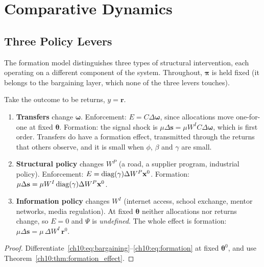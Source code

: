 \documentclass[../structural_economics_book.tex]{subfiles}
\begin{document}
\section{Comparative Dynamics}
\label{ch10:sec:comparative}

\subsection{Three Policy Levers}

The formation model distinguishes three types of structural intervention, each operating on a different component of the system. Throughout, $\boldsymbol{\pi}$ is held fixed (it belongs to the bargaining layer, which none of the three levers touches).

\begin{proposition}\label{ch10:prop:levers}
Take the outcome to be returns, $y = \mathbf{r}$.
\begin{enumerate}
\item \textbf{Transfers} change $\boldsymbol{\omega}$. Enforcement: $E = C\Delta\boldsymbol{\omega}$, since allocations move one-for-one at fixed $\boldsymbol{\theta}$. Formation: the signal shock is $\mu\Delta\mathbf{s} = \mu W^I C\Delta\boldsymbol{\omega}$, which is first order. Transfers do have a formation effect, transmitted through the returns that others observe, and it is small when $\phi$, $\beta$ and $\gamma$ are small.
\item \textbf{Structural policy} changes $W^P$ (a road, a supplier program, industrial policy). Enforcement: $E = \operatorname{diag}(\gamma)\Delta W^P\mathbf{x}^0$. Formation: $\mu\Delta\mathbf{s} = \mu W^I\operatorname{diag}(\gamma)\Delta W^P\mathbf{x}^0$.
\item \textbf{Information policy} changes $W^I$ (internet access, school exchange, mentor networks, media regulation). At fixed $\boldsymbol{\theta}$ neither allocations nor returns change, so $E = 0$ and $\Psi$ is \textit{undefined}. The whole effect is formation: $\mu\Delta\mathbf{s} = \mu\,\Delta W^I\,\mathbf{r}^0$.
\end{enumerate}
\end{proposition}

\begin{proof}
Differentiate~\eqref{ch10:eq:bargaining}--\eqref{ch10:eq:formation} at fixed $\boldsymbol{\theta}^0$, and use Theorem~\ref{ch10:thm:formation_effect}.
\end{proof}
\end{document}
